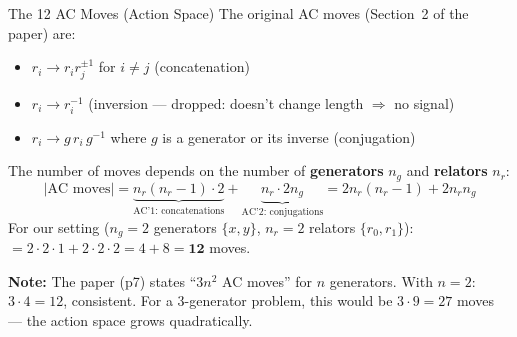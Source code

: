 \documentclass[aspectratio=169,11pt]{beamer}
\newcommand{\inv}[1]{#1^{-1}}
\begin{document}
\begin{frame}{The 12 AC Moves (Action Space)}
  \footnotesize
  The original AC moves (Section~2 of the paper) are:
  \begin{itemize}\setlength\itemsep{0pt}
    \item[(AC1)] $r_i \to r_i r_j^{\pm 1}$ for $i \neq j$ \quad (concatenation)
    \item[(AC2)] $r_i \to \inv{r_i}$ \quad (inversion --- \alert{dropped}: doesn't change length $\Rightarrow$ no signal)
    \item[(AC3)] $r_i \to g\, r_i\, \inv{g}$ where $g$ is a generator or its inverse \quad (conjugation)
  \end{itemize}

  \smallskip
  The number of moves depends on the number of \textbf{generators} $n_g$ and \textbf{relators} $n_r$:
  \[
    |\text{AC moves}| = \underbrace{n_r(n_r - 1) \cdot 2}_{\text{AC'1: concatenations}}
    + \underbrace{n_r \cdot 2 n_g}_{\text{AC'2: conjugations}}
    = 2n_r(n_r - 1) + 2 n_r n_g
  \]
  For our setting ($n_g = 2$ generators $\{x, y\}$, $n_r = 2$ relators $\{r_0, r_1\}$):
  $= 2 \cdot 2 \cdot 1 + 2 \cdot 2 \cdot 2 = 4 + 8 = \mathbf{12}$ moves.

  \smallskip
  {\scriptsize \textbf{Note:} The paper (p7) states ``$3n^2$ AC moves'' for $n$ generators.
  With $n = 2$: $3 \cdot 4 = 12$, consistent. For a 3-generator problem, this would
  be $3 \cdot 9 = 27$ moves --- the action space grows quadratically.}

\end{frame}
\end{document}
